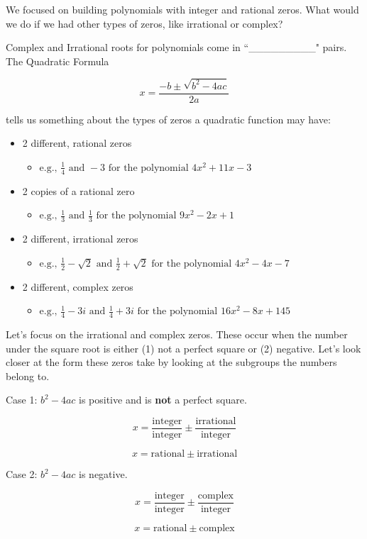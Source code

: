 \documentclass{ximera}
\begin{document}
We focused on building polynomials with integer and rational zeros. What would we do if we had other types of zeros, like irrational or complex?

\begin{theorem}
Complex and Irrational roots for polynomials come in ``\_\_\_\_\_\_\_\_\_" pairs. \\

The Quadratic Formula 

$$x = \frac{-b \pm \sqrt{b^2 - 4ac}}{2a}$$

tells us something about the types of zeros a quadratic function may have:
	\begin{itemize}
		\item 2 different, rational zeros
			\begin{itemize}
				\item $\text{e.g., } \frac{1}{4} \text{ and } -3 \text{ for the polynomial } 4x^2+11x-3$
			\end{itemize}
		\item 2 copies of a rational zero
			\begin{itemize}
				\item $\text{e.g., } \frac{1}{3} \text{ and } \frac{1}{3} \text{ for the polynomial } 9x^2-2x+1$
			\end{itemize} 
		\item 2 different, irrational zeros
			\begin{itemize}
				\item $\text{e.g., } \frac{1}{2} - \sqrt{2} \text{ and } \frac{1}{2} + \sqrt{2} \text{ for the polynomial } 4x^2-4x-7$
			\end{itemize}
		\item 2 different, complex zeros
			\begin{itemize}
				\item $\text{e.g., } \frac{1}{4}-3i \text{ and } \frac{1}{4}+3i \text{ for the polynomial } 16x^2-8x+145$
			\end{itemize}
	\end{itemize}

Let's focus on the irrational and complex zeros. These occur when the number under the square root is either (1) not a perfect square or (2) negative. Let's look closer at the form these zeros take by looking at the subgroups the numbers belong to.

Case 1: $b^2 - 4ac$ is positive and is \textbf{not} a perfect square. 

$$x = \frac{\text{integer}}{\text{integer}} \pm \frac{\text{irrational}}{\text{integer}}$$

$$ x = \text{rational} \pm \text{irrational} $$

Case 2: $b^2 - 4ac$ is negative.

$$x = \frac{\text{integer}}{\text{integer}} \pm \frac{\text{complex}}{\text{integer}}$$

$$ x = \text{rational} \pm \text{complex} $$
\end{theorem}
\end{document}
